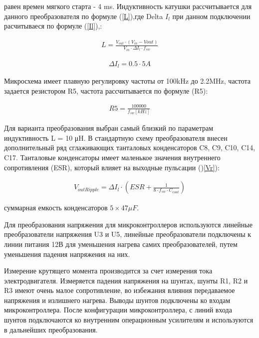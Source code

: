 равен времен мягкого старта - 4 ms. Индуктивность катушки рассчитывается для данного преобразователя по формуле (\ref{L}),где Delta $I_{l}$ при данном подключении расчитываеся по формуле (\ref{Il}),:
\begin{ceqn}
	\begin{align} \label{L}
		L = \frac{V_{out}\cdot(V_{in}-V{out})}{V_{in}\cdot\Delta  I_l\cdot f_{sw}}
	\end{align}
\end{ceqn}

\begin{ceqn}
	\begin{align} \label{Il}
		\Delta I_l = 0.5 \cdot 5A
	\end{align}
\end{ceqn}

Микросхема имеет плавную регулировку частоты от 100kHz до 2.2MHz, частота задается резистором R5, частота рассчитывается по формуле (R5):
\begin{ceqn}
	\begin{align} \label{R5}
		R5 = \frac{100000}{f_{sw}[kHz]}
	\end{align}
\end{ceqn}

Для варианта преобразования выбран самый близкий по параметрам индуктивность L = 10 μH. В стандартную схему преобразователя внесен дополнительный ряд сглаживающих танталовых конденсаторов C8, C9, C10, C14, C17. Танталовые конденсаторы имеет маленькое значения внутреннего сопротивления (ESR), который влияет на выходные пульсации ()\ref{Vr}):

\begin{ceqn}
	\begin{align} \label{Vr}
		V_{outRipple} = \Delta I_l \cdot (ESR + \frac{1}{8\cdot f_{sw} \cdot C_{cout}})
	\end{align}
\end{ceqn}

суммарная емкость конденсаторов $5 \times  47\mu F$.

Для преобразования напряжения для микроконтроллеров используются линейные преобразователи напряжения U3 и U5, линейные преобразователи подключены к линии питания 12В для уменьшения   нагрева самих преобразователей, путем уменьшения падения напряжения на них.

Измерение крутящего момента производится за счет измерения тока электродвигателя. Измеряется падения напряжения на шунтах, шунты R1, R2 и R3 имеют очень малое сопротивление, во избежания влияния передаваемое напряжения и излишнего  нагрева. Выводы шунтов подключены ко входам микроконтроллера. После конфигурации микроконтроллера, с линий входа шунтов подключаются ко внутренним операционным усилителям и используются в дальнейших преобразования.

